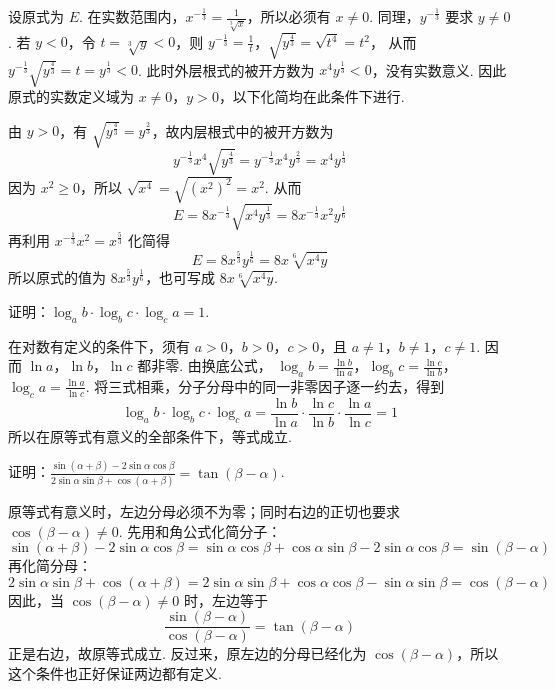 \begin{solution}
设原式为 \(E\). 在实数范围内，\(x^{-\frac{1}{3}}=\frac{1}{\sqrt[3]{x}}\)，所以必须有 \(x\ne0\). 同理，\(y^{-\frac{1}{3}}\) 要求 \(y\ne0\). 若 \(y<0\)，令 \(t=\sqrt[3]{y}<0\)，则
\(y^{-\frac{1}{3}}=\frac{1}{t}\)，\(\sqrt{y^{\frac{4}{3}}}=\sqrt{t^4}=t^2\)，
从而 \(y^{-\frac{1}{3}}\sqrt{y^{\frac{4}{3}}}=t=y^{\frac{1}{3}}<0\). 此时外层根式的被开方数为 \(x^4y^{\frac{1}{3}}<0\)，没有实数意义. 因此原式的实数定义域为 \(x\ne0\)，\(y>0\)，以下化简均在此条件下进行.

由 \(y>0\)，有 \(\sqrt{y^{\frac{4}{3}}}=y^{\frac{2}{3}}\)，故内层根式中的被开方数为
\[
y^{-\frac{1}{3}}x^4\sqrt{y^{\frac{4}{3}}}=y^{-\frac{1}{3}}x^4y^{\frac{2}{3}}=x^4y^{\frac{1}{3}}
\]
因为 \(x^2\geqslant0\)，所以 \(\sqrt{x^4}=\sqrt{(x^2)^2}=x^2\). 从而
\[
E=8x^{-\frac{1}{3}}\sqrt{x^4y^{\frac{1}{3}}}=8x^{-\frac{1}{3}}x^2y^{\frac{1}{6}}
\]
再利用 \(x^{-\frac13}x^2=x^{\frac53}\) 化简得
\[
E=8x^{\frac{5}{3}}y^{\frac{1}{6}}=8x\sqrt[6]{x^4y}
\]
所以原式的值为 \(8x^{\frac{5}{3}}y^{\frac{1}{6}}\)，也可写成 \(8x\sqrt[6]{x^4y}\).
\end{solution}

\begin{problem}
证明：\(\log_a b\cdot\log_b c\cdot\log_c a=1\).
\end{problem}

\begin{solution}
在对数有定义的条件下，须有 \(a>0\)，\(b>0\)，\(c>0\)，且 \(a\ne1\)，\(b\ne1\)，\(c\ne1\). 因而 \(\ln a\)，\(\ln b\)，\(\ln c\) 都非零. 由换底公式，
\(\log_a b=\frac{\ln b}{\ln a}\)，\(\log_b c=\frac{\ln c}{\ln b}\)，\(\log_c a=\frac{\ln a}{\ln c}\).
将三式相乘，分子分母中的同一非零因子逐一约去，得到
\[
\log_a b\cdot\log_b c\cdot\log_c a
=\frac{\ln b}{\ln a}\cdot\frac{\ln c}{\ln b}\cdot\frac{\ln a}{\ln c}=1
\]
所以在原等式有意义的全部条件下，等式成立.
\end{solution}

\begin{problem}
证明：\(\frac{\sin\left(\alpha+\beta\right)-2\sin\alpha\cos\beta}{2\sin\alpha\sin\beta+\cos\left(\alpha+\beta\right)}=\tan\left(\beta-\alpha\right)\).
\end{problem}

\begin{solution}
原等式有意义时，左边分母必须不为零；同时右边的正切也要求 \(\cos\left(\beta-\alpha\right)\ne0\). 先用和角公式化简分子：
\[
\sin\left(\alpha+\beta\right)-2\sin\alpha\cos\beta=\sin\alpha\cos\beta+\cos\alpha\sin\beta-2\sin\alpha\cos\beta=\sin\left(\beta-\alpha\right)
\]
再化简分母：
\[
2\sin\alpha\sin\beta+\cos\left(\alpha+\beta\right)=2\sin\alpha\sin\beta+\cos\alpha\cos\beta-\sin\alpha\sin\beta=\cos\left(\beta-\alpha\right)
\]
因此，当 \(\cos\left(\beta-\alpha\right)\ne0\) 时，左边等于
\[
\frac{\sin\left(\beta-\alpha\right)}{\cos\left(\beta-\alpha\right)}=\tan\left(\beta-\alpha\right)
\]
正是右边，故原等式成立. 反过来，原左边的分母已经化为 \(\cos\left(\beta-\alpha\right)\)，所以这个条件也正好保证两边都有定义.
\end{solution}

